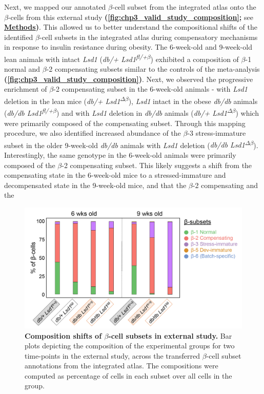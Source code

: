 Next, we mapped our annotated $\beta$-cell subset from the integrated atlas onto the $\beta$-cells from this external study \textbf{(\autoref{fig:chp3_valid_study_composition};} see \hyperref[subsubsec:met_chp3_validation]{\textbf{Methods}}\textbf{)}. This allowed us to better understand the compositional shifts of the identified $\beta$-cell subsets in the integrated atlas during compensatory mechanisms in response to insulin resistance during obesity. The 6-week-old and 9-week-old lean animals with intact \textit{Lsd1} (\textit{db/+ Lsd1\textsuperscript{fl/+$\beta$}}) exhibited a composition of $\beta$-1 normal and $\beta$-2 compensating subsets similar to the controls of the meta-analysis \textbf{(\autoref{fig:chp3_valid_study_composition})}. Next, we observed the progressive enrichment of $\beta$-2 compensating subset in the 6-week-old animals - with \textit{Lsd1} deletion in the lean mice (\textit{db/+ Lsd1\textsuperscript{$\Delta\beta$}}), \textit{Lsd1} intact in the obese \textit{db/db} animals (\textit{db/db Lsd1\textsuperscript{fl/+$\beta$}})  and with \textit{Lsd1} deletion in \textit{db/db} animals (\textit{db/+ Lsd1\textsuperscript{$\Delta\beta$}})  which were primarily composed of the compensating subset. Through this mapping procedure, we also identified increased abundance of the $\beta$-3 stress-immature subset in the older 9-week-old \textit{db/db} animals with \textit{Lsd1} deletion (\textit{db/db Lsd1\textsuperscript{$\Delta\beta$}}). Interestingly, the same genotype in the 6-week-old animals were primarily composed of the $\beta$-2 compensating subset. This likely suggests a shift from the compensating state in the 6-week-old mice to a stressed-immature and decompensated state in the 9-week-old mice, and that the $\beta$-2 compensating and the  


\begin{figure}[H]
    \centering
    \includegraphics[width=\linewidth]{Chapter5/Fig/F3-17-03.png}
    \caption[Composition shifts of $\beta$-cell subsets in external study]{\textbf{Composition shifts of $\beta$-cell subsets in external study.} Bar plots depicting the composition of the experimental groups for two time-points in the external study, across the transferred $\beta$-cell subset annotations from the integrated atlas. The compositions were computed as percentage of cells in each subset over all cells in the group.}
    \label{fig:chp3_valid_study_composition}
\end{figure}

